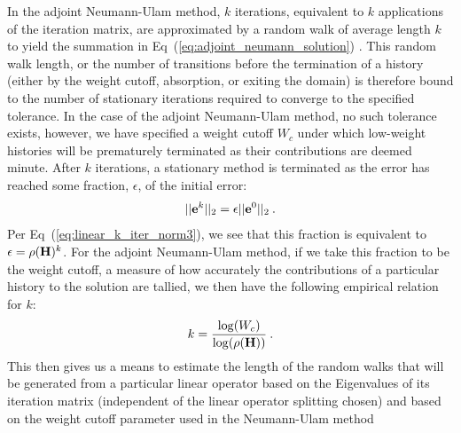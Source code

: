 \documentclass[letterpaper,12pt]{article}
\begin{document}
In the adjoint Neumann-Ulam method, $k$ iterations, equivalent to $k$
applications of the iteration matrix, are approximated by a random
walk of average length $k$ to yield the summation in
Eq~(\ref{eq:adjoint_neumann_solution})
\cite{dimov_new_1998,halton_sequential_1994,danilov_asymptotic_2000}. This
random walk length, or the number of transitions before the
termination of a history (either by the weight cutoff, absorption, or
exiting the domain) is therefore bound to the number of stationary
iterations required to converge to the specified tolerance. In the
case of the adjoint Neumann-Ulam method, no such tolerance exists,
however, we have specified a weight cutoff $W_c$ under which
low-weight histories will be prematurely terminated as their
contributions are deemed minute. After $k$ iterations, a stationary
method is terminated as the error has reached some fraction,
$\epsilon$, of the initial error:
\begin{equation}
  ||\mathbf{e}^{k}||_2 = \epsilon ||\mathbf{e}^0||_2\:.
  \label{eq:linear_k_iter_norm4}
\end{equation}
Per Eq~(\ref{eq:linear_k_iter_norm3}), we see that this fraction is
equivalent to $\epsilon = \rho(\mathbf{H})^k$. For the adjoint Neumann-Ulam
method, if we take this fraction to be the weight cutoff, a measure of
how accurately the contributions of a particular history to the
solution are tallied, we then have the following empirical relation
for $k$:
\begin{equation}
  k = \frac{ \log(W_c) }{ \log( \rho(\mathbf{H}) ) }\:.
  \label{eq:analytic_k}
\end{equation}
This then gives us a means to estimate the length of the random walks
that will be generated from a particular linear operator based on the
Eigenvalues of its iteration matrix (independent of the linear
operator splitting chosen) and based on the weight cutoff parameter
used in the Neumann-Ulam method
\end{document}
